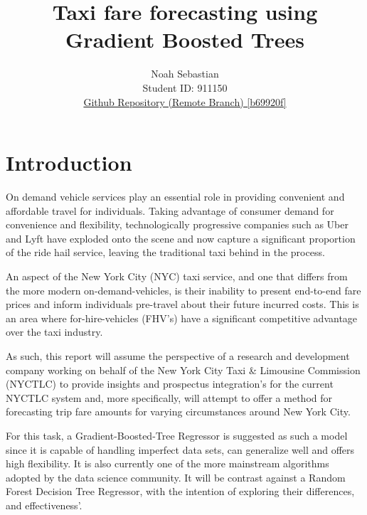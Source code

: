 \documentclass[11pt]{article}
\title{\textbf{Taxi fare forecasting using Gradient Boosted Trees} \\}
\author{
Noah Sebastian \\
Student ID: 911150 \\
\href{https://github.com/MAST30034-Applied-Data-Science/mast30034-project-1-911150/commit/b69920f80525f1fb42052ef7958d6927dcfa679b}{Github Repository (Remote Branch) [b69920f]}
}
\begin{document}
\maketitle

\section{Introduction}
On demand vehicle services play an essential role in providing convenient and affordable travel for individuals. 
Taking advantage of consumer demand for convenience and flexibility, technologically progressive companies such as Uber and Lyft have exploded onto the scene and now capture a significant proportion of the ride hail service, leaving the traditional taxi behind in the process. 

An aspect of the New York City (NYC) taxi service, and one that differs from the more modern on-demand-vehicles, is their inability to present end-to-end fare prices and inform individuals pre-travel about their future incurred costs. This is an area where for-hire-vehicles (FHV's) have a significant competitive advantage over the taxi industry.

As such, this report will assume the perspective of a research and development company working on behalf of the New York City Taxi \& Limousine Commission (NYCTLC) to provide insights and prospectus integration's for the current NYCTLC system and, more specifically, will attempt to offer a method for forecasting trip fare amounts for varying circumstances around New York City.

For this task, a Gradient-Boosted-Tree Regressor is suggested as such a model since it is capable of handling imperfect data sets, can generalize well and offers high flexibility. It is also currently one of the more mainstream algorithms adopted by the data science community. 
It will be contrast against a Random Forest Decision Tree Regressor, with the intention of exploring their differences, and effectiveness'.


\end{document}
